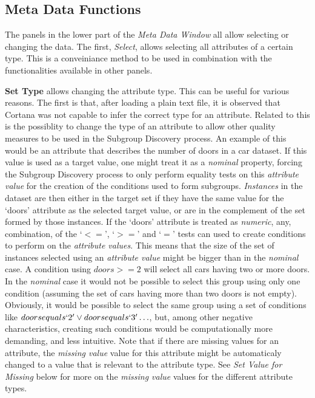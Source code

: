 \documentclass{article}
\begin{document}
\subsection{Meta Data Functions}
\label{meta-data-window:meta-data-functions}
The panels in the lower part of the \emph{Meta Data Window} all allow selecting or changing the data.
The first, \emph{Select}, allows selecting all attributes of a certain type.
This is a conveiniance method to be used in combination with the functionalities available in other panels.

\textbf{Set Type} allows changing the attribute type.
This can be useful for various reasons.
The first is that, after loading a plain text file, it is observed that Cortana was not capable to infer the correct type for an attribute.
Related to this is the possiblity to change the type of an attribute to allow other quality measures to be used in the Subgroup Discovery process.
An example of this would be an attribute that describes the number of doors in a car dataset.
If this value is used as a target value, one might treat it as a \emph{nominal} property, forcing the Subgroup Discovery process to only perform equality tests on this \emph{attribute value} for the creation of the conditions used to form subgroups.
\emph{Instances} in the dataset are then either in the target set if they have the same value for the `doors' attribute as the selected target value, or are in the complement of the set formed by those instances.
If the `doors' attribute is treated as \emph{numeric}, any, combination, of the `$<=$', `$>=$' and `$=$' tests can used to create conditions to perform on the \emph{attribute values}.
This means that the size of the set of instances selected using an \emph{attribute value} might be bigger than in the \emph{nominal} case.
A condition using $doors >= 2$ will select all cars having two or more doors.
In the \emph{nominal} case it would not be possible to select this group using only one condition (assuming the set of cars having more than two doors is not empty).
Obviously, it would be possible to select the same group using a set of conditions like $doors equals `2' \vee doors equals `3' \ldots$, but, among other negative characteristics, creating such conditions would be computationally more demanding, and less intuitive.
Note that if there are missing values for an attribute, the \emph{missing value} value for this attribute might be automaticaly changed to a value that is relevant to the attribute type.
See \emph{Set Value for Missing} below for more on the \emph{missing value} values for the different attribute types.
\end{document}
